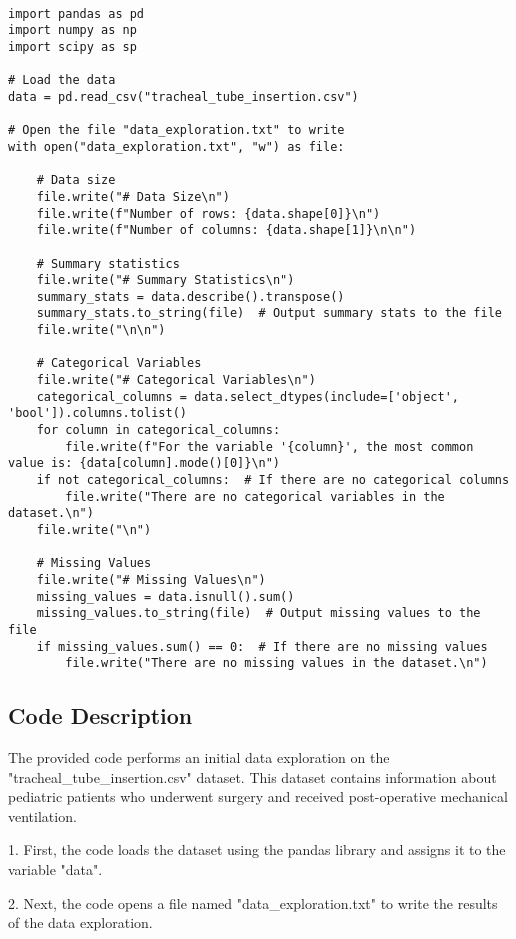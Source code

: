 \documentclass[11pt]{article}
\begin{document}
\begin{verbatim}

import pandas as pd
import numpy as np
import scipy as sp

# Load the data
data = pd.read_csv("tracheal_tube_insertion.csv")

# Open the file "data_exploration.txt" to write
with open("data_exploration.txt", "w") as file:
    
    # Data size
    file.write("# Data Size\n")
    file.write(f"Number of rows: {data.shape[0]}\n")
    file.write(f"Number of columns: {data.shape[1]}\n\n")

    # Summary statistics
    file.write("# Summary Statistics\n")
    summary_stats = data.describe().transpose()
    summary_stats.to_string(file)  # Output summary stats to the file
    file.write("\n\n")
    
    # Categorical Variables
    file.write("# Categorical Variables\n")
    categorical_columns = data.select_dtypes(include=['object', 'bool']).columns.tolist()
    for column in categorical_columns:
        file.write(f"For the variable '{column}', the most common value is: {data[column].mode()[0]}\n")
    if not categorical_columns:  # If there are no categorical columns
        file.write("There are no categorical variables in the dataset.\n")
    file.write("\n")
    
    # Missing Values
    file.write("# Missing Values\n")
    missing_values = data.isnull().sum()
    missing_values.to_string(file)  # Output missing values to the file
    if missing_values.sum() == 0:  # If there are no missing values
        file.write("There are no missing values in the dataset.\n")

\end{verbatim}

\subsection{Code Description}

The provided code performs an initial data exploration on the "tracheal\_tube\_insertion.csv" dataset. This dataset contains information about pediatric patients who underwent surgery and received post-operative mechanical ventilation.

1. First, the code loads the dataset using the pandas library and assigns it to the variable "data".

2. Next, the code opens a file named "data\_exploration.txt" to write the results of the data exploration.
\end{document}
